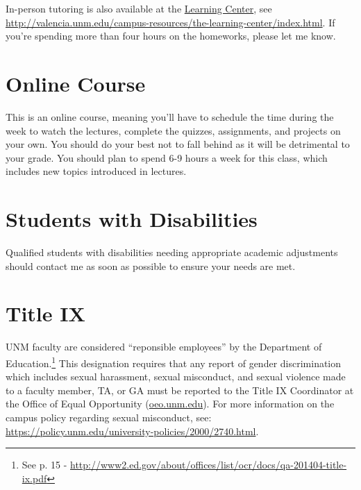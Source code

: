 \documentclass[12pt]{article}
\begin{document}
In-person tutoring is also available at the \href{http://valencia.unm.edu/campus-resources/the-learning-center/index.html}{Learning Center}, see \url{http://valencia.unm.edu/campus-resources/the-learning-center/index.html}.  If you're spending more than four hours on the homeworks, please let me know.

\section*{Online Course}
This is an online course, meaning you'll have to schedule the time during the week to watch the lectures, complete the quizzes, assignments, and projects on your own.  You should do your best not to fall behind as it will be detrimental to your grade.  You should plan to spend 6-9 hours a week for this class, which includes new topics introduced in lectures.

\section*{Students with Disabilities}
Qualified students with disabilities needing appropriate academic adjustments should contact me as soon as possible to ensure your needs are met.

\section*{Title IX}
UNM faculty are considered ``reponsible employees'' by the Department of Education.\footnote{See p. 15 - \url{http://www2.ed.gov/about/offices/list/ocr/docs/qa-201404-title-ix.pdf}}  This designation requires that any report of gender discrimination which includes sexual harassment, sexual misconduct, and sexual violence made to a faculty member, TA, or GA must be reported to the Title IX Coordinator at the Office of Equal Opportunity (\url{oeo.unm.edu}).  For more information on the campus policy regarding sexual misconduct, see: \url{https://policy.unm.edu/university-policies/2000/2740.html}.
\end{document}
